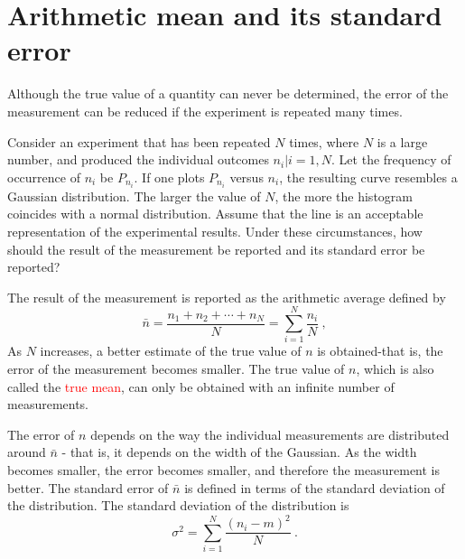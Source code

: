 \documentclass[12pt,a4paper]{article}
\begin{document}
\section{Arithmetic mean and its standard error}
Although the true value of a quantity can never be determined, the error of the measurement can be reduced if the experiment is repeated many times.

Consider an experiment that has been repeated $N$ times, where $N$ is a large number, and produced the individual outcomes $n_i|i = 1, N$. Let the frequency of occurrence of $n_i$ be $P_{n_i}$. If one plots $P_{n_i}$ versus $n_i$, the resulting curve resembles a Gaussian distribution. The larger the value of $N$, the more the histogram coincides with a normal distribution. Assume that the line is an acceptable representation of the experimental results. Under these circumstances, how should the result of the measurement be reported and its standard error be reported?

The result of the measurement is reported as the arithmetic average defined by
\begin{equation}
\bar{n} = \dfrac{n_1 +n_2 +\cdots +n_N}{N} = \sum_{i=1}^N \dfrac{n_i}{N} ~,
\end{equation}
As $N$ increases, a better estimate of the true value of $n$ is obtained-that is, the error of the measurement becomes smaller. The true value of $n$, which is also called the \textcolor{red}{true mean}, can only be obtained with an infinite number of measurements.

The error of $n$ depends on the way the individual measurements are distributed around $\bar{n}$ - that is, it depends on the width of the Gaussian. As the width becomes smaller, the error becomes smaller, and therefore the measurement is better. The standard error of $\bar{n}$ is defined in terms of the standard deviation of the distribution. The standard deviation of the distribution is
\begin{equation}
\sigma^2 = \sum_{i=1}^N \dfrac{(n_i-m)^2}{N} ~.
\end{equation}
\end{document}
